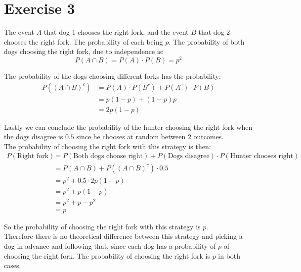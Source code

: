 \section{Exercise 3}

The event $A$ that dog 1 chooses the right fork, and the event $B$ that dog 2 chooses the right fork. The probability of each being $p$. The probability of both dogs choosing the right fork, due to independence is:
\[
	P(A \cap B) = P(A) \cdot P(B) = p^2
\]

The probability of the dogs choosing different forks has the probability:
\begin{align*}
	P((A\cap B)^c) & = P(A) \cdot P(B^c) + P(A^c) \cdot P(B) \\
	               & = p(1-p) + (1-p)p                       \\
	               & = 2p(1-p)
\end{align*}

Lastly we can conclude the probability of the hunter choosing the right fork when the dogs disagree is $0.5$ since he chooses at random between 2 outcomes.\\[1ex]

The probability of choosing the right fork with this strategy is then:
\begin{align*}
	P(\text{Right fork}) & = P(\text{Both dogs choose right}) + P(\text{Dogs disagree}) \cdot P(\text{Hunter chooses right}) \\
	                     & = P(A \cap B) + P((A\cap B)^c) \cdot 0.5                                                          \\
	                     & = p^2 + 0.5 \cdot 2p(1-p)                                                                         \\
	                     & = p^2 + p(1-p)                                                                                    \\
	                     & = p^2 + p - p^2                                                                                   \\
	                     & = p
\end{align*}

So the probability of choosing the right fork with this strategy is $p$.\\[1ex]

Therefore there is no theoretical difference between this strategy and picking a dog in advance and following that, since each dog has a probability of $p$ of choosing the right fork. The probability of choosing the right fork is $p$ in both cases.\\[1em]
